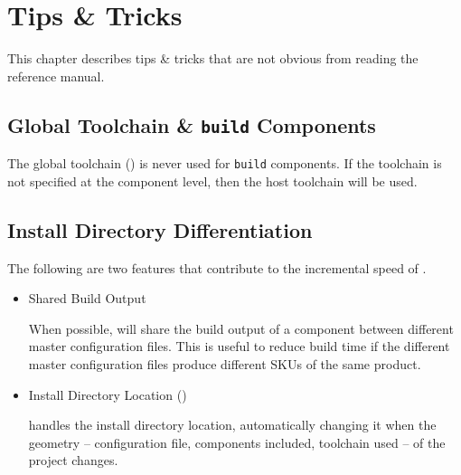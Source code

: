 %
%
%
%
\chapter{Tips \& Tricks}

This chapter describes tips \& tricks that are not obvious from
reading the reference manual.

\section{Global Toolchain \& \texttt{build} Components}

The global toolchain () is never used for
\texttt{build} components.  If the toolchain is not specified at the
component level, then the host toolchain will be used.

\section{Install Directory Differentiation}\label{tips:install-directory}

The following are two features that contribute to the incremental
speed of \lmsbw.

\begin{itemize}
\item Shared Build Output

  When possible, \lmsbw will share the build output of a component
  between different master configuration files.  This is useful to
  reduce build time if the different master configuration files
  produce different SKUs of the same product.

\item Install Directory Location ()

  \lmsbw handles the install directory location, automatically
  changing it when the geometry -- configuration file, components
  included, toolchain used -- of the project changes.

\end{itemize}

